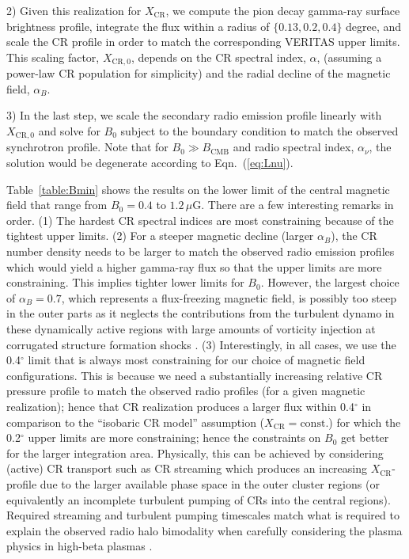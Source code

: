 \documentclass[12pt,manuscript]{aastex}
\newcommand{\rmn}{\mathrm}
\newcommand{\CR}{\mathrm{CR}}
\begin{document}
2) Given this realization for $X_\CR$, we compute the pion decay gamma-ray
surface brightness profile, integrate the flux within a radius of $\{0.13, 0.2,
0.4\}$ degree, and scale the CR profile in order to match the corresponding
VERITAS upper limits.  This scaling factor, $X_{\CR,0}$, depends on the CR
spectral index, $\alpha$, (assuming a power-law CR population for simplicity) and
the radial decline of the magnetic field, $\alpha_B$.

3) In the last step, we scale the secondary radio emission profile linearly
with $X_{\CR,0}$ and solve for $B_0$ subject to the boundary condition to match
the observed synchrotron profile. Note that for $B_0 \gg B_\rmn{CMB}$ and radio
spectral index, $\alpha_\nu$, the solution would be degenerate according to
Eqn.~(\ref{eq:Lnu}). 

Table~\ref{table:Bmin} shows the results on the lower limit of the central
magnetic field that range from $B_0 = 0.4$ to $1.2\,\mu$G. There are a few
interesting remarks in order.  (1) The hardest CR spectral indices are most
constraining because of the tightest upper limits.  (2) For a steeper magnetic decline
(larger $\alpha_B$), the CR number density needs to be larger to match the
observed radio emission profiles which would yield a higher gamma-ray flux so
that the upper limits are more constraining. This implies tighter lower limits for $B_0$.
However, the largest choice of $\alpha_B=0.7$, which represents a flux-freezing
magnetic field, is possibly too steep in the outer parts as it neglects the
contributions from the turbulent dynamo in these dynamically active regions with
large amounts of vorticity injection at corrugated structure formation shocks
\citep[as observationally inferred for the first time
by][]{2011ApJ...730...22P}.  (3) Interestingly, in all cases, we use the
0.4$^\circ$ limit that is always most constraining for our choice of magnetic
field configurations.  This is because we need a substantially increasing
relative CR pressure profile to match the observed radio profiles (for a given
magnetic realization); hence that CR realization produces a larger flux within
0.4$^\circ$ in comparison to the ``isobaric CR model'' assumption ($X_\CR =
\rmn{const.}$) for which the 0.2$^\circ$ upper limits are more constraining;
hence the constraints on $B_0$ get better for the larger integration area.
Physically, this can be achieved by considering (active) CR transport such as CR
streaming which produces an increasing $X_\CR$-profile due to the larger
available phase space in the outer cluster regions (or equivalently an
incomplete turbulent pumping of CRs into the central regions).  Required
streaming and turbulent pumping timescales match what is required to explain the
observed radio halo bimodality when carefully considering the plasma physics in
high-beta plasmas \citep{2011A&A...527A..99E}.
\end{document}
